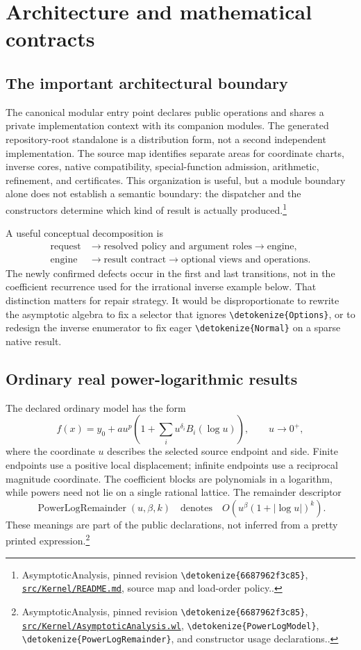 \documentclass[11pt]{article}
\newcommand{\code}[1]{{\ttfamily\expandafter\nolinkurl\expandafter{\detokenize{#1}}}}
\newcommand{\repo}{https://github.com/VladimirReshetnikov/Asymptotic/blob/6687962f3c858a4f93623cfc496f33e35c6763d4/}
\newcommand{\src}[2]{\footnote{AsymptoticAnalysis, pinned revision \code{6687962f3c85}, \href{\repo#1}{\nolinkurl{#1}}, #2.}}
\begin{document}
\section{Architecture and mathematical contracts}

\subsection{The important architectural boundary}
The canonical modular entry point declares public operations and shares a private implementation context with its companion modules. The generated repository-root standalone is a distribution form, not a second independent implementation. The source map identifies separate areas for coordinate charts, inverse cores, native compatibility, special-function admission, arithmetic, refinement, and certificates. This organization is useful, but a module boundary alone does not establish a semantic boundary: the dispatcher and the constructors determine which kind of result is actually produced.\src{src/Kernel/README.md}{source map and load-order policy.}

A useful conceptual decomposition is
\[
\begin{aligned}
 \text{request}&\longrightarrow\text{resolved policy and argument roles}\longrightarrow\text{engine},\\
 \text{engine}&\longrightarrow\text{result contract}\longrightarrow\text{optional views and operations}.
\end{aligned}
\]
The newly confirmed defects occur in the first and last transitions, not in the coefficient recurrence used for the irrational inverse example below. That distinction matters for repair strategy. It would be disproportionate to rewrite the asymptotic algebra to fix a selector that ignores \code{Options}, or to redesign the inverse enumerator to fix eager \code{Normal} on a sparse native result.

\subsection{Ordinary real power-logarithmic results}
The declared ordinary model has the form
\[
 f(x)=y_0+a u^p\left(1+\sum_i u^{\delta_i}B_i(\log u)\right),\qquad u\to0^+,
\]
where the coordinate $u$ describes the selected source endpoint and side. Finite endpoints use a positive local displacement; infinite endpoints use a reciprocal magnitude coordinate. The coefficient blocks are polynomials in a logarithm, while powers need not lie on a single rational lattice. The remainder descriptor
\[
 \operatorname{PowerLogRemainder}(u,\beta,k)
 \quad\text{denotes}\quad
 O\!\left(u^\beta(1+|\log u|)^k\right).
\]
These meanings are part of the public declarations, not inferred from a pretty printed expression.\src{src/Kernel/AsymptoticAnalysis.wl}{\code{PowerLogModel}, \code{PowerLogRemainder}, and constructor usage declarations.}
\end{document}
